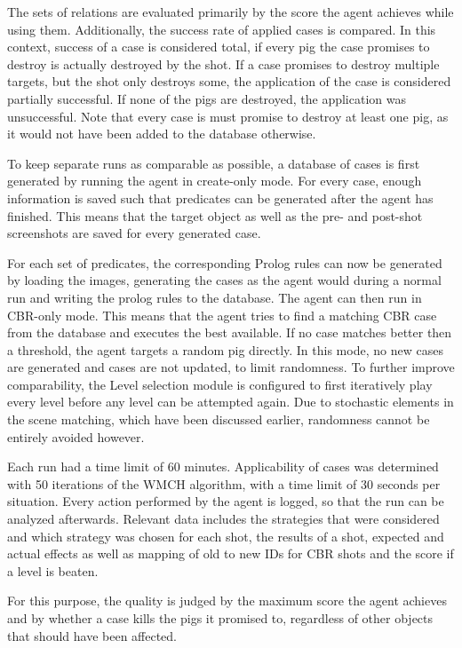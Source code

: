 The sets of relations are evaluated primarily by the score the agent achieves while using them. Additionally, the success rate of applied cases is compared.
In this context, success of a case is considered total, if every pig the case promises to destroy is actually destroyed by the shot. If a case promises to destroy multiple targets, but the shot only destroys some, the application of the case is considered partially successful. If none of the pigs are destroyed, the application was unsuccessful.
Note that every case is must promise to destroy at least one pig, as it would not have been added to the database otherwise.


To keep separate runs as comparable as possible, a database of cases is first generated by running the agent in create-only mode.
For every case, enough information is saved such that predicates can be generated after the agent has finished. This means that the target object as well as the pre- and post-shot screenshots are saved for every generated case.

For each set of predicates, the corresponding Prolog rules can now be generated by loading the images, generating the cases as the agent would during a normal run and writing the prolog rules to the database. The agent can then run in CBR-only mode. This means that the agent tries to find a matching CBR case from the database and executes the best available. If no case matches better then a threshold, the agent targets a random pig directly. In this mode, no new cases are generated and cases are not updated, to limit randomness.
To further improve comparability, the Level selection module is configured to first iteratively play every level before any level can be attempted again.
Due to stochastic elements in the scene matching, which have been discussed earlier, randomness cannot be entirely avoided however.

Each run had a time limit of 60 minutes.
Applicability of cases was determined with 50 iterations of the \ac{WMCH} algorithm, with a time limit of 30 seconds per situation. Every action performed by the agent is logged, so that the run can be analyzed afterwards.
Relevant data includes the strategies that were considered and which strategy was chosen for each shot, the results of a shot, expected and actual effects  as well as mapping of old to new IDs for CBR shots and the score if a level is beaten.


For this purpose, the quality is judged by the maximum score the agent achieves and by whether a case kills the pigs it promised to, regardless of other objects that should have been affected.


